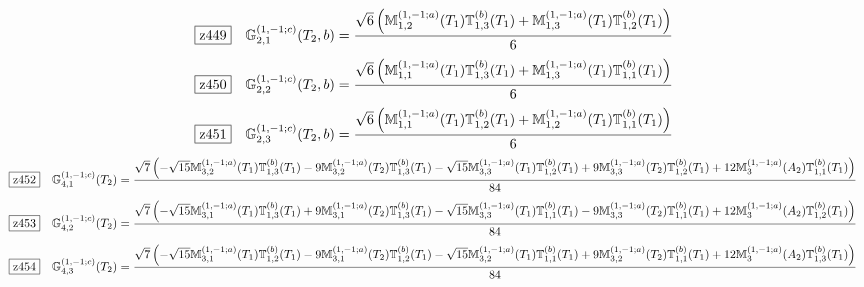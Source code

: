 \documentclass[fleqn,10pt,landscape]{jsarticle}
\begin{document}
\begin{dmath*}
\hspace*{3mm}\fbox{z449}\quad \mathbb{G}_{2,1}^{(1,-1;c)}(T_{2},b)=\frac{\sqrt{6} \left(\mathbb{M}_{1,2}^{(1,-1;a)}(T_{1}) \mathbb{T}_{1,3}^{(b)}(T_{1}) + \mathbb{M}_{1,3}^{(1,-1;a)}(T_{1}) \mathbb{T}_{1,2}^{(b)}(T_{1})\right)}{6}
\end{dmath*}
\begin{dmath*}
\hspace*{3mm}\fbox{z450}\quad \mathbb{G}_{2,2}^{(1,-1;c)}(T_{2},b)=\frac{\sqrt{6} \left(\mathbb{M}_{1,1}^{(1,-1;a)}(T_{1}) \mathbb{T}_{1,3}^{(b)}(T_{1}) + \mathbb{M}_{1,3}^{(1,-1;a)}(T_{1}) \mathbb{T}_{1,1}^{(b)}(T_{1})\right)}{6}
\end{dmath*}
\begin{dmath*}
\hspace*{3mm}\fbox{z451}\quad \mathbb{G}_{2,3}^{(1,-1;c)}(T_{2},b)=\frac{\sqrt{6} \left(\mathbb{M}_{1,1}^{(1,-1;a)}(T_{1}) \mathbb{T}_{1,2}^{(b)}(T_{1}) + \mathbb{M}_{1,2}^{(1,-1;a)}(T_{1}) \mathbb{T}_{1,1}^{(b)}(T_{1})\right)}{6}
\end{dmath*}
\begin{dmath*}
\hspace*{3mm}\fbox{z452}\quad \mathbb{G}_{4,1}^{(1,-1;c)}(T_{2})=\frac{\sqrt{7} \left(- \sqrt{15} \mathbb{M}_{3,2}^{(1,-1;a)}(T_{1}) \mathbb{T}_{1,3}^{(b)}(T_{1}) - 9 \mathbb{M}_{3,2}^{(1,-1;a)}(T_{2}) \mathbb{T}_{1,3}^{(b)}(T_{1}) - \sqrt{15} \mathbb{M}_{3,3}^{(1,-1;a)}(T_{1}) \mathbb{T}_{1,2}^{(b)}(T_{1}) + 9 \mathbb{M}_{3,3}^{(1,-1;a)}(T_{2}) \mathbb{T}_{1,2}^{(b)}(T_{1}) + 12 \mathbb{M}_{3}^{(1,-1;a)}(A_{2}) \mathbb{T}_{1,1}^{(b)}(T_{1})\right)}{84}
\end{dmath*}
\begin{dmath*}
\hspace*{3mm}\fbox{z453}\quad \mathbb{G}_{4,2}^{(1,-1;c)}(T_{2})=\frac{\sqrt{7} \left(- \sqrt{15} \mathbb{M}_{3,1}^{(1,-1;a)}(T_{1}) \mathbb{T}_{1,3}^{(b)}(T_{1}) + 9 \mathbb{M}_{3,1}^{(1,-1;a)}(T_{2}) \mathbb{T}_{1,3}^{(b)}(T_{1}) - \sqrt{15} \mathbb{M}_{3,3}^{(1,-1;a)}(T_{1}) \mathbb{T}_{1,1}^{(b)}(T_{1}) - 9 \mathbb{M}_{3,3}^{(1,-1;a)}(T_{2}) \mathbb{T}_{1,1}^{(b)}(T_{1}) + 12 \mathbb{M}_{3}^{(1,-1;a)}(A_{2}) \mathbb{T}_{1,2}^{(b)}(T_{1})\right)}{84}
\end{dmath*}
\begin{dmath*}
\hspace*{3mm}\fbox{z454}\quad \mathbb{G}_{4,3}^{(1,-1;c)}(T_{2})=\frac{\sqrt{7} \left(- \sqrt{15} \mathbb{M}_{3,1}^{(1,-1;a)}(T_{1}) \mathbb{T}_{1,2}^{(b)}(T_{1}) - 9 \mathbb{M}_{3,1}^{(1,-1;a)}(T_{2}) \mathbb{T}_{1,2}^{(b)}(T_{1}) - \sqrt{15} \mathbb{M}_{3,2}^{(1,-1;a)}(T_{1}) \mathbb{T}_{1,1}^{(b)}(T_{1}) + 9 \mathbb{M}_{3,2}^{(1,-1;a)}(T_{2}) \mathbb{T}_{1,1}^{(b)}(T_{1}) + 12 \mathbb{M}_{3}^{(1,-1;a)}(A_{2}) \mathbb{T}_{1,3}^{(b)}(T_{1})\right)}{84}
\end{dmath*}
\end{document}

